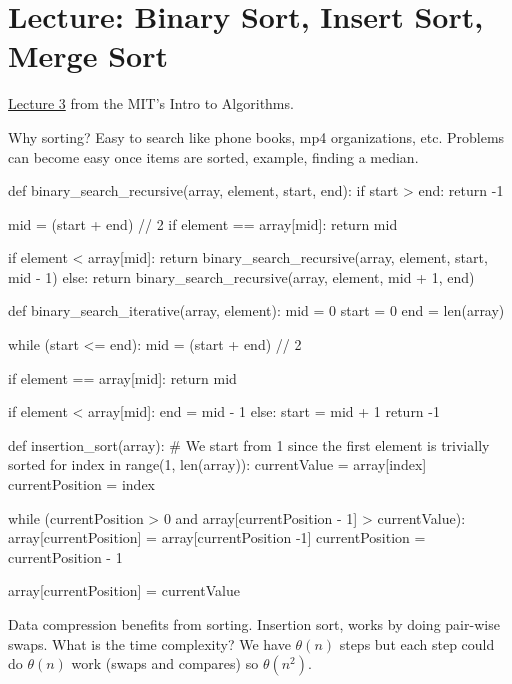 \chapter{Lecture: Binary Sort, Insert Sort, Merge Sort}
\href{https://ocw.mit.edu/courses/electrical-engineering-and-computer-science/6-006-introduction-to-algorithms-fall-2011/lecture-videos/lecture-3-insertion-sort-merge-sort/}{Lecture 3} from the MIT's 
Intro to Algorithms.

Why sorting? Easy to search like phone books, mp4 organizations, etc. Problems can become easy
once items are sorted, example, finding a median.
\begin{python}
def binary_search_recursive(array, element, start, end):
    if start > end:
        return -1

    mid = (start + end) // 2
    if element == array[mid]:
        return mid

    if element < array[mid]:
        return binary_search_recursive(array, element, start, mid - 1)
    else:
        return binary_search_recursive(array, element, mid + 1, end)
        
def binary_search_iterative(array, element):
    mid = 0
    start = 0
    end = len(array)

    while (start <= end):
        mid = (start + end) // 2

        if element == array[mid]:
            return mid

        if element < array[mid]:
            end = mid - 1
        else:
            start = mid + 1
    return -1
    
def insertion_sort(array):
    # We start from 1 since the first element is trivially sorted
    for index in range(1, len(array)):
        currentValue = array[index]
        currentPosition = index

        while (currentPosition > 0 and 
            array[currentPosition - 1] > currentValue):
            array[currentPosition] = array[currentPosition -1]
            currentPosition = currentPosition - 1

        array[currentPosition] = currentValue
\end{python}
Data compression benefits from sorting. Insertion sort, works by doing pair-wise swaps. What is the time
complexity? We have \(\theta(n)\) steps but each step could do \(\theta(n)\) work (swaps and compares)
 so \(\theta(n^2)\). 
 
